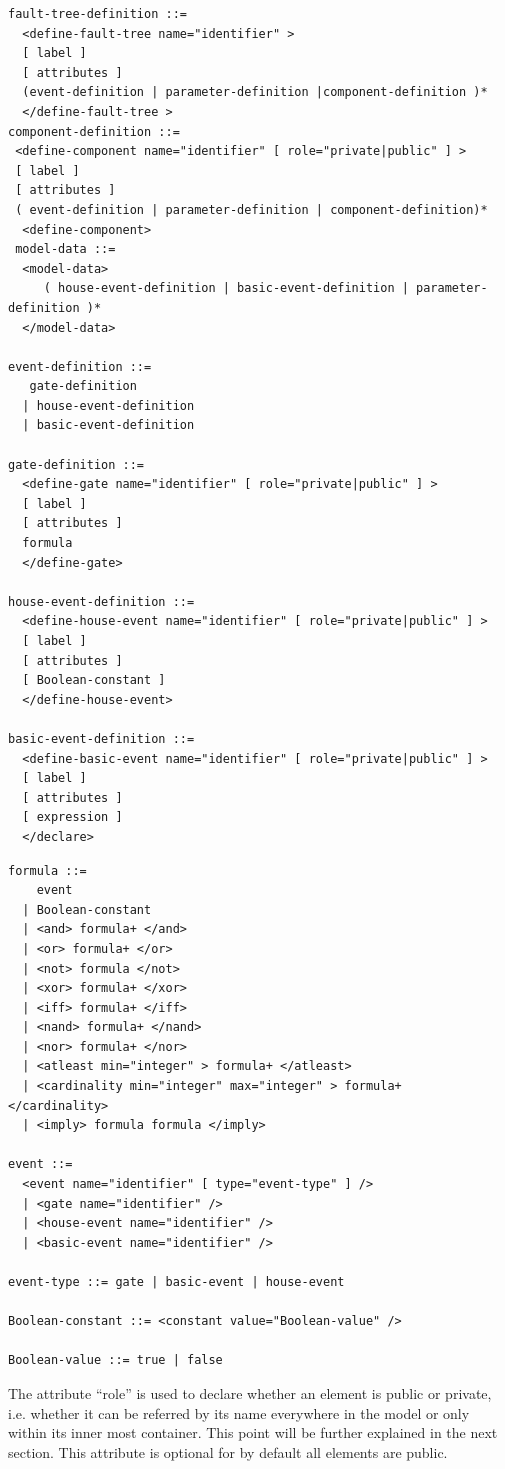 \documentclass[11pt]{article}
\begin{document}
\lstset{language=[LaTeX]TeX,label= ,caption= ,captionpos=b,numbers=none}
\begin{lstlisting}
fault-tree-definition ::=
  <define-fault-tree name="identifier" >
  [ label ]
  [ attributes ]
  (event-definition | parameter-definition |component-definition )*
  </define-fault-tree >
component-definition ::=
 <define-component name="identifier" [ role="private|public" ] >
 [ label ]
 [ attributes ]
 ( event-definition | parameter-definition | component-definition)*
  <define-component>
 model-data ::=
  <model-data>
     ( house-event-definition | basic-event-definition | parameter-definition )*
  </model-data>

event-definition ::=
   gate-definition
  | house-event-definition
  | basic-event-definition

gate-definition ::=
  <define-gate name="identifier" [ role="private|public" ] >
  [ label ]
  [ attributes ]
  formula
  </define-gate>

house-event-definition ::=
  <define-house-event name="identifier" [ role="private|public" ] >
  [ label ]
  [ attributes ]
  [ Boolean-constant ]
  </define-house-event>

basic-event-definition ::=
  <define-basic-event name="identifier" [ role="private|public" ] >
  [ label ]
  [ attributes ]
  [ expression ]
  </declare>
\end{lstlisting}

\lstset{language=[LaTeX]TeX,label= ,caption= ,captionpos=b,numbers=none}
\begin{lstlisting}
formula ::=
    event
  | Boolean-constant
  | <and> formula+ </and>
  | <or> formula+ </or>
  | <not> formula </not>
  | <xor> formula+ </xor>
  | <iff> formula+ </iff>
  | <nand> formula+ </nand>
  | <nor> formula+ </nor>
  | <atleast min="integer" > formula+ </atleast>
  | <cardinality min="integer" max="integer" > formula+  </cardinality>
  | <imply> formula formula </imply>

event ::=
  <event name="identifier" [ type="event-type" ] />
  | <gate name="identifier" />
  | <house-event name="identifier" />
  | <basic-event name="identifier" />

event-type ::= gate | basic-event | house-event

Boolean-constant ::= <constant value="Boolean-value" />

Boolean-value ::= true | false
\end{lstlisting}

The attribute ``role'' is used to declare whether an element is public or
private, i.e. whether it can be referred by its name everywhere in the
model or only within its inner most container. This point will be
further explained in the next section. This attribute is optional for by
default all elements are public.
\end{document}
